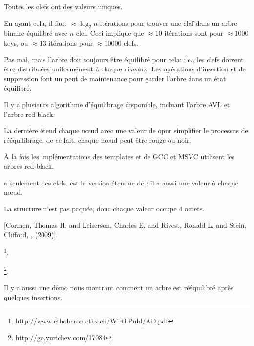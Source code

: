 Toutes les clefs ont des valeurs uniques.

En ayant cela, il faut $\approx \log_{2} n$ itérations pour trouver une clef dans
un arbre binaire équilibré avec $n$ clef.
Ceci implique que $\approx 10$ itérations sont pour $\approx 1000$ keys, ou $\approx 13$
itérations pour $\approx 10000$ clefs.

Pas mal, mais l'arbre doit toujours être équilibré pour cela: i.e., les clefs doivent
être distribuées uniformément à chaque niveaux.
Les opérations d'insertion et de suppression font un peut de maintenance pour garder
l'arbre dans un état équilibré.

Il y a plusieurs algorithme d'équilibrage disponible, incluant l'arbre AVL et l'arbre red-black.

La dernière étend chaque n\oe{}ud avec une valeur de  opur simplifier
le processus de rééquilibrage, de ce fait, chaque n\oe{}ud peut être rouge ou noir.

À la fois les implémentations des templates  et  de GCC
et MSVC utilisent les arbres red-black.

 a seulement des clefs.
 est la version étendue de : il a aussi une valeur à chaque
n\oe{}ud.






La structure n'est pas paquée, donc chaque valeur \Tchar occupe 4 octets.





[Cormen, Thomas H. and Leiserson, Charles E. and Rivest, Ronald L. and Stein, Clifford,
, (2009)].

\footnote{\url{http://www.ethoberon.ethz.ch/WirthPubl/AD.pdf}}.







\footnote{\url{http://go.yurichev.com/17084}}.



Il y a aussi une démo nous montrant comment un arbre est rééquilibré après quelques
insertions.





